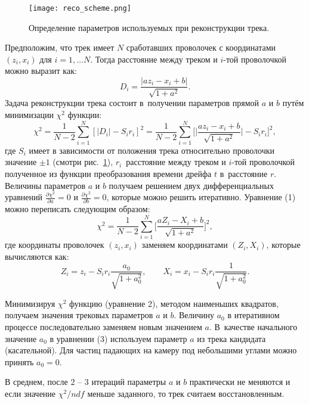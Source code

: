 \begin{figure}[h]
  \begin{center}
    \texttt{[image: reco\_scheme.png]}
    \caption {Определение параметров используемых при реконструкции трека.}
    \label{fig:reco_scheme}
  \end{center}
\end{figure}

Предположим, что трек имеет $N$ сработавших проволочек с координатами
$(z_{i}, x_{i})$ для $i = 1, \ldots N$. Тогда расстояние между треком и $i$-той
проволочкой можно выразит как:
\[
D_{i} = \frac{|a z_{i} - x_{i} + b|}{\sqrt{1 + a^{2}}}.
\]
Задача реконструкции трека состоит в~получении параметров прямой $a$ и $b$
путём минимизации $\chi^2$ функции:
\begin{equation}
  \chi^2 = \frac{1}{N-2}\sum_{i=1}^{N} [|D_i| -S_ir_i]^2 =
  \frac{1}{N-2}\sum_{i=1}^{N} \biggl[
  \Big|\frac{az_i - x_i + b}{\sqrt{1 + a^2}}\Big| - S_ir_i\biggr]^2,
\end{equation}
где $S_i$ имеет в зависимости от положения трека относительно проволочки
значение $\pm{1}$ (смотри рис.~\ref{fig:reco_scheme}),
$r_i$~расстояние между треком и $i$-той проволочкой полученное из функции
преобразования времени дрейфа $t$ в~расстояние $r$. Величины параметров
$a$ и $b$ получаем решением двух дифференциальных уравнений
$\frac{\partial \chi^2}{\partial a} = 0$ и
$\frac{\partial \chi^2}{\partial b} = 0$, которые можно решить итеративно.
Уравнение (1) можно переписать следующим образом:
\begin{equation}
  \chi^2 = \frac{1}{N-2}\sum_{i=1}^{N}
  \biggl[\frac{aZ_i - X_i + b}{\sqrt{1 + a^2}}\biggr]^2,
\end{equation}
где координаты проволочек $(z_{i}, x_{i})$ заменяем координатами
$(Z_{i}, X_{i})$, которые вычисляются как:
\begin{equation}
  Z_i = z_i - S_ir_i \frac{a_0}{\sqrt{1 + a_0^2}}, \qquad
  X_i = x_i - S_ir_i \frac{1}{\sqrt{1 + a_0^2}}.
\end{equation}

Минимизируя $\chi^2$ функцию (уравнение 2), методом наименьших квадратов,
получаем значения трековых параметров $a$ и $b$. Величину $a_{0}$ в итеративном
процессе последовательно заменяем новым значением $a$. В~качестве начального
значение $a_{0}$ в уравнении (3) используем параметр $a$ из трека кандидата
(касательной). Для частиц падающих на камеру под небольшими углами можно
принять $a_{0} = 0$.

В среднем, после 2 -- 3 итераций параметры $a$ и $b$ практически не меняются
и если значение $\chi^2/ndf$  меньше заданного, то трек считаем восстановленным.

